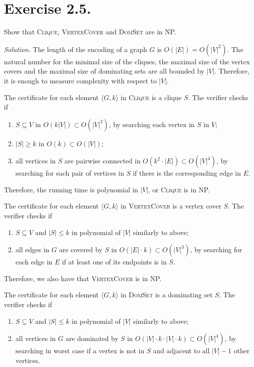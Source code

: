 \section{Exercise 2.5.} Show that \textsc{Clique}, \textsc{VertexCover} and \textsc{DomSet} are in NP.

\textit{Solution.} The length of the encoding of a graph $G$ is $O(|E|) = O(|V|^2)$. The natural number for the minimal size of the cliques, the maximal size of the vertex covers and the maximal size of dominating sets are all bounded by $|V|$. Therefore, it is enough to measure complexity with respect to $|V|$.


The certificate for each element $\langle G,k\rangle$ in \textsc{Clique} is a clique $S$. The verifier checks if
\begin{enumerate}
  \item $S \subseteq V$ in $O(k|V|)\subset O(|V|^2)$, by searching each vertex in $S$ in $V$;
  \item $|S| \ge k$ in $O(k)\subset O(|V|)$;
  \item all vertices in $S$ are pairwise connected in $O(k^2\cdot |E|) \subset O(|V|^4)$, by searching for each pair of vertices in $S$ if there is the corresponding edge in $E$.
\end{enumerate}

Therefore, the running time is polynomial in $|V|$, or \textsc{Clique} is in NP.

The certificate for each element $\langle G,k\rangle$ in \textsc{VertexCover} is a vertex cover $S$. The verifier checks if
\begin{enumerate}
  \item $S \subseteq V$ and $|S| \le k$ in polynomial of $|V|$ similarly to above;
  \item all edges in $G$ are covered by $S$ in $O(|E|\cdot k) \subset O(|V|^3)$, by searching for each edge in $E$ if at least one of its endpoints is in $S$.
\end{enumerate}

Therefore, we also have that \textsc{VertexCover} is in NP.

The certificate for each element $\langle G,k\rangle$ in \textsc{DomSet} is a dominating set $S$. The verifier checks if
\begin{enumerate}
  \item $S \subseteq V$ and $|S| \le k$ in polynomial of $|V|$ similarly to above;
  \item all vertices in $G$ are dominated by $S$ in $O(|V|\cdot k\cdot |V|\cdot k) \subset O(|V|^4)$, by searching in worst case if a vertex is not in $S$ and adjacent to all $|V|-1$ other vertices.
\end{enumerate}

